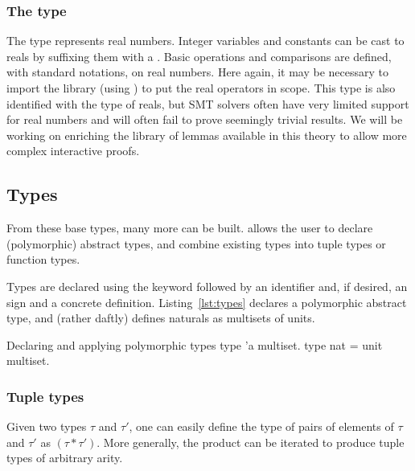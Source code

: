 \subsubsection*{The  type}
The  type represents real numbers. Integer variables and constants
can be cast to reals by suffixing them with a . Basic operations and
comparisons are defined, with standard notations, on real numbers. Here again,
it may be necessary to import the library (using )
to put the real operators in scope. This type is also identified with the
\WhyThree type of reals, but SMT solvers often have very limited support for
real numbers and will often fail to prove seemingly trivial results.
%
We will be working on enriching the library of lemmas available in this theory
to allow more complex interactive proofs.


\subsection{Types}
From these base types, many more can be built. \EC allows the user to declare
 (polymorphic) abstract types, and combine existing types into tuple types or
function types.

Types are declared using the  keyword followed by an identifier and,
if desired, an \rawec{=} sign and a concrete definition. Listing~\ref{lst:types}
declares a polymorphic abstract  type, and (rather daftly)
defines naturals as multisets of units.

\begin{easycrypt}[label={lst:types}]{Declaring and applying polymorphic types}
type 'a multiset.
type nat = unit multiset.
\end{easycrypt}

\subsubsection*{Tuple types}
Given two types $\tau$ and $\tau'$, one can easily define the type of pairs of
elements of $\tau$ and $\tau'$ as $\left(\tau * \tau'\right)$. More generally,
the product can be iterated to produce tuple types of arbitrary arity.

